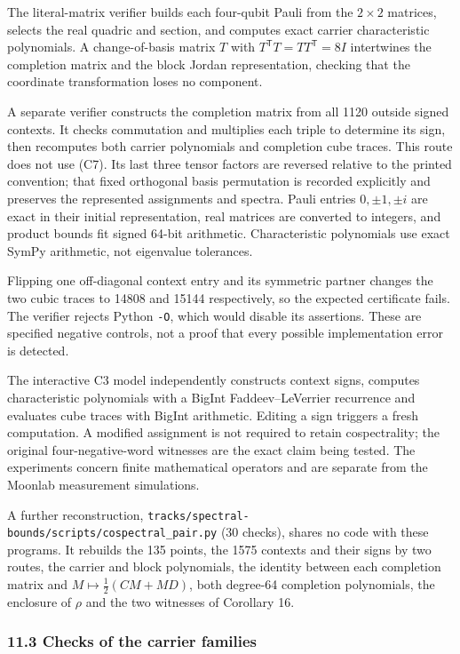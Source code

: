 \documentclass[11pt,a4paper]{article}
\begin{document}
The literal-matrix verifier builds each four-qubit Pauli from the \(2\times2\) matrices, selects the
real quadric and section, and computes exact carrier characteristic polynomials. A change-of-basis
matrix \(T\) with \(T^{\mathsf T}T=TT^{\mathsf T}=8I\) intertwines the completion matrix and the block
Jordan representation, checking that the coordinate transformation loses no component.

A separate verifier constructs the completion matrix from all 1120 outside signed contexts. It
checks commutation and multiplies each triple to determine its sign, then recomputes both carrier
polynomials and completion cube traces. This route does not use (C7). Its last three tensor factors
are reversed relative to the printed convention; that fixed orthogonal basis permutation is recorded
explicitly and preserves the represented assignments and spectra. Pauli entries \(0,\pm1,\pm i\) are
exact in their initial representation, real matrices are converted to integers, and product bounds
fit signed 64-bit arithmetic. Characteristic polynomials use exact SymPy arithmetic, not eigenvalue
tolerances.

Flipping one off-diagonal context entry and its symmetric partner changes the two cubic traces to
14808 and 15144 respectively, so the expected certificate fails. The verifier rejects Python \texttt{-O},
which would disable its assertions. These are specified negative controls, not a proof that every
possible implementation error is detected.

The interactive C3 model independently constructs context signs, computes characteristic polynomials
with a BigInt Faddeev--LeVerrier recurrence and evaluates cube traces with BigInt arithmetic. Editing a
sign triggers a fresh computation. A modified assignment is not required to retain cospectrality;
the original four-negative-word witnesses are the exact claim being tested. The experiments concern
finite mathematical operators and are separate from the Moonlab measurement simulations.

A further reconstruction, \nolinkurl{tracks/spectral-bounds/scripts/cospectral_pair.py} (30 checks), shares no code with these
programs. It rebuilds the 135 points, the 1575 contexts and their signs by two routes, the carrier and
block polynomials, the identity between each completion matrix and \(M\mapsto\frac12(CM+MD)\), both degree-64
completion polynomials, the enclosure of \(\rho\) and the two witnesses of Corollary 16.

\subsubsection{11.3 Checks of the carrier families}\label{113-checks-of-the-carrier-families}
\end{document}
